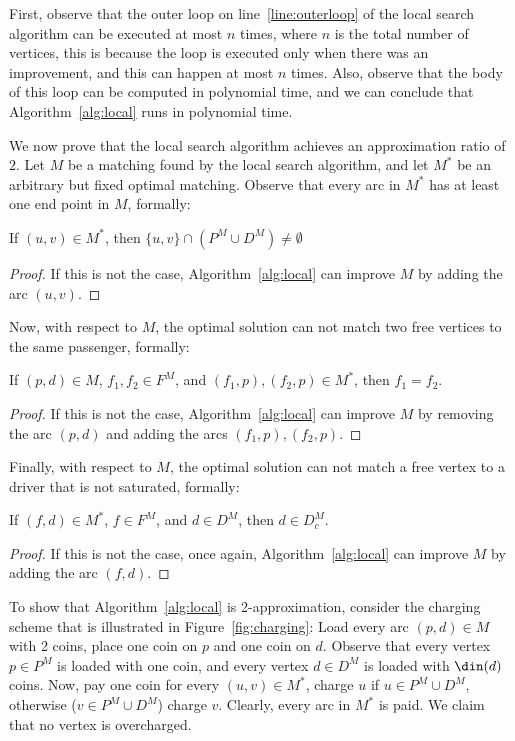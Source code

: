 First, observe that the outer loop on line~\ref{line:outerloop} of the local search algorithm
can be executed at most $n$ times, 
where $n$ is the total number of vertices, 
this is because the loop is executed only when there was an improvement, 
and this can happen at most $n$ times.
Also, observe that the body of this loop can be computed in polynomial time, 
and we can conclude that Algorithm~\ref{alg:local} runs in polynomial time.
    
We now prove that the local search algorithm achieves an approximation ratio of $2$.
Let $M$ be a matching found by the local search algorithm, 
and let $M^*$ be an arbitrary but fixed optimal matching.
Observe that every arc in $M^*$ has at least one end point in $M$, formally: 
\begin{observation}
If $(u,v) \in M^*$, then $\{u,v\} \cap (P^M \cup D^M) \neq \emptyset$
\end{observation}

\begin{proof}
If this is not the case, Algorithm~\ref{alg:local} can improve $M$
by adding the arc $(u,v)$.  
\end{proof}

Now, with respect to $M$, the optimal solution can not match two free vertices to the same
passenger, formally:
\begin{observation}
\label{observation:one-free}
If $(p,d) \in M$, $f_1, f_2 \in F^M$, and $(f_1, p), (f_2, p) \in M^*$, then $f_1 = f_2$.
\end{observation}

\begin{proof}
If this is not the case, Algorithm~\ref{alg:local} can improve $M$ 
by removing the arc $(p,d)$ and adding the arcs $(f_1, p), (f_2, p)$.
\end{proof}

Finally, with respect to $M$, the optimal solution can not match a free vertex to a driver
that is not saturated, formally: 
\begin{observation}
\label{observation:saturated}
If $(f,d) \in M^*$, $f \in F^M$, and $d \in D^M$, then $d \in D^M_c$.
\end{observation}

\begin{proof}
If this is not the case, once again, Algorithm~\ref{alg:local} can improve $M$
by adding the arc $(f,d)$.
\end{proof}

To show that Algorithm~\ref{alg:local} is 2-approximation, 
consider the charging scheme that is illustrated in Figure~\ref{fig:charging}:
Load every arc $(p,d) \in M$ with 2 coins, 
place one coin on $p$ and one coin on $d$.
Observe that every vertex $p \in P^M$ is loaded with one coin, 
and every vertex $d \in D^M$ is loaded with $\din(d)$ coins.   
Now, pay one coin for every $(u,v) \in M^*$, charge $u$ if $u \in P^M \cup D^M$, 
otherwise ($v \in P^M \cup D^M$) charge $v$.
Clearly, every arc in $M^*$ is paid.
We claim that no vertex is overcharged.

